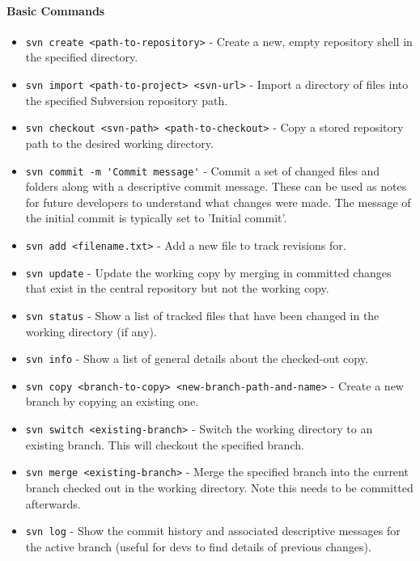 \paragraph{Basic Commands}
\begin{itemize}
    \item \lstinline{svn create <path-to-repository>} - Create a new, empty repository shell in the specified directory.
    \item \lstinline{svn import <path-to-project> <svn-url>} - Import a directory of files into the specified Subversion repository path.
    \item \lstinline{svn checkout <svn-path> <path-to-checkout>} - Copy a stored repository path to the desired working directory.
    \item \lstinline{svn commit -m 'Commit message'} - Commit a set of changed files and folders along with a descriptive commit message. These can be used as notes for future developers to understand what changes were made. The message of the initial commit is typically set to 'Initial commit'.
    \item \lstinline{svn add <filename.txt>} - Add a new file to track revisions for.
    \item \lstinline{svn update} - Update the working copy by merging in committed changes that exist in the central repository but not the working copy.
    \item \lstinline{svn status} - Show a list of tracked files that have been changed in the working directory (if any).
    \item \lstinline{svn info} - Show a list of general details about the checked-out copy.
    \item \lstinline{svn copy <branch-to-copy> <new-branch-path-and-name>} - Create a new branch by copying an existing one.
    \item \lstinline{svn switch <existing-branch>} - Switch the working directory to an existing branch. This will checkout the specified branch.
    \item \lstinline{svn merge <existing-branch>} - Merge the specified branch into the current branch checked out in the working directory. Note this needs to be committed afterwards.
    \item \lstinline{svn log} - Show the commit history and associated descriptive messages for the active branch (useful for devs to find details of previous changes).
\end{itemize}

